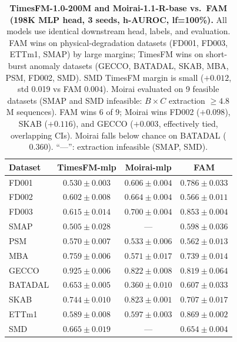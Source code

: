 \documentclass{article}
\begin{document}
\begin{table}[h]
  \centering
  \caption{\textbf{TimesFM-1.0-200M and Moirai-1.1-R-base vs.\ FAM (198K MLP head, 3 seeds, h-AUROC, lf=100\%).} All models use identical downstream head, labels, and evaluation. FAM wins on physical-degradation datasets (FD001, FD003, ETTm1, SMAP) by large margins; TimesFM wins on short-burst anomaly datasets (GECCO, BATADAL, SKAB, MBA, PSM, FD002, SMD). SMD TimesFM margin is small ($+0.012$, std 0.019 vs FAM 0.004). Moirai evaluated on 9 feasible datasets (SMAP and SMD infeasible: $B{\times}C$ extraction ${\geq}4.8$M sequences). FAM wins 6 of 9; Moirai wins FD002 ($+0.098$), SKAB ($+0.116$), and GECCO ($+0.003$, effectively tied, overlapping CIs). Moirai falls below chance on BATADAL ($0.360$). ``---'': extraction infeasible (SMAP, SMD).}
  \label{tab:extra_baselines}
  \small
  \begin{tabular}{lccc}
    \toprule
    Dataset & TimesFM-mlp                & Moirai-mlp        & FAM \\
    \midrule
    FD001   & $0.530 \pm 0.003$          & $0.606 \pm 0.004$ & $\mathbf{0.786 \pm 0.033}$ \\
    FD002   & $0.602 \pm 0.008$          & $\mathbf{0.664 \pm 0.004}$ & $0.566 \pm 0.011$ \\
    FD003   & $0.615 \pm 0.014$          & $0.700 \pm 0.004$ & $\mathbf{0.853 \pm 0.004}$ \\
    SMAP    & $0.505 \pm 0.028$          & ---               & $\mathbf{0.598 \pm 0.036}$ \\
    PSM     & $\mathbf{0.570 \pm 0.007}$                   & $0.533 \pm 0.006$    & $0.562 \pm 0.013$ \\
    MBA     & $\mathbf{0.759 \pm 0.006}$ & $0.571 \pm 0.017$ & $0.739 \pm 0.014$ \\
    GECCO   & $\mathbf{0.925 \pm 0.006}$ & $0.822 \pm 0.008$ & $0.819 \pm 0.064$ \\
    BATADAL & $\mathbf{0.653 \pm 0.005}$ & $0.360 \pm 0.010$ & $0.607 \pm 0.033$ \\
    SKAB    & $0.744 \pm 0.010$          & $\mathbf{0.823 \pm 0.001}$ & $0.707 \pm 0.017$ \\
    ETTm1   & $0.589 \pm 0.008$          & $0.597 \pm 0.003$ & $\mathbf{0.869 \pm 0.002}$ \\
    SMD     & $\mathbf{0.665 \pm 0.019}$ & ---               & $0.654 \pm 0.004$ \\
    \bottomrule
  \end{tabular}
  \vspace{2pt}

\end{table}
\end{document}
